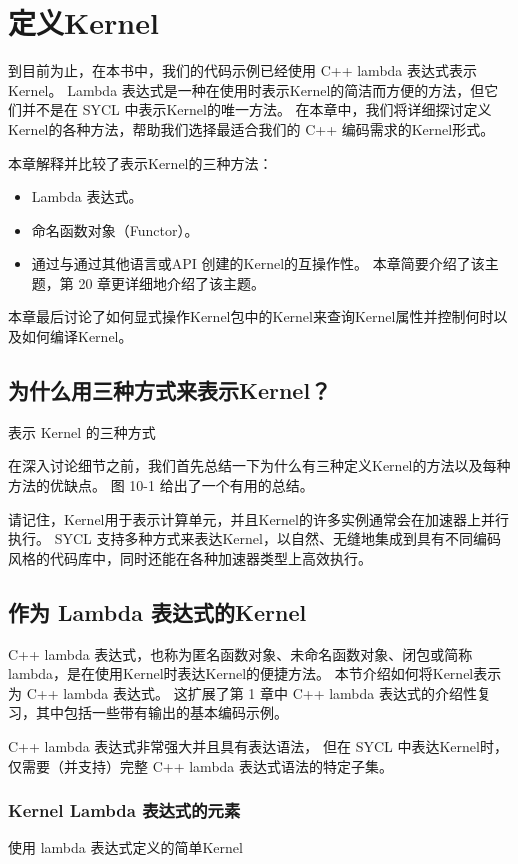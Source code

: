 \section{定义Kernel}
到目前为止，在本书中，我们的代码示例已经使用 C++ lambda 表达式表示Kernel。 
Lambda 表达式是一种在使用时表示Kernel的简洁而方便的方法，但它们并不是在 SYCL 中表示Kernel的唯一方法。 
在本章中，我们将详细探讨定义Kernel的各种方法，帮助我们选择最适合我们的 C++ 编码需求的Kernel形式。

本章解释并比较了表示Kernel的三种方法：

\begin{itemize}
	\item Lambda 表达式。

	\item 命名函数对象（Functor）。

	\item 通过与通过其他语言或API 创建的Kernel的互操作性。 本章简要介绍了该主题，第 20 章更详细地介绍了该主题。
\end{itemize}

本章最后讨论了如何显式操作Kernel包中的Kernel来查询Kernel属性并控制何时以及如何编译Kernel。


\subsection{为什么用三种方式来表示Kernel？}
{\color{red} 表示 Kernel 的三种方式}

在深入讨论细节之前，我们首先总结一下为什么有三种定义Kernel的方法以及每种方法的优缺点。 
图 10-1 给出了一个有用的总结。

请记住，Kernel用于表示计算单元，并且Kernel的许多实例通常会在加速器上并行执行。 
SYCL 支持多种方式来表达Kernel，以自然、无缝地集成到具有不同编码风格的代码库中，同时还能在各种加速器类型上高效执行。

\subsection{作为 Lambda 表达式的Kernel}
C++ lambda 表达式，也称为匿名函数对象、未命名函数对象、闭包或简称 lambda，是在使用Kernel时表达Kernel的便捷方法。 
本节介绍如何将Kernel表示为 C++ lambda 表达式。 
这扩展了第 1 章中 C++ lambda 表达式的介绍性复习，其中包括一些带有输出的基本编码示例。

C++ lambda 表达式非常强大并且具有表达语法，
但在 SYCL 中表达Kernel时，仅需要（并支持）完整 C++ lambda 表达式语法的特定子集。

\subsubsection{Kernel Lambda 表达式的元素}
{\color{red} 使用 lambda 表达式定义的简单Kernel}

